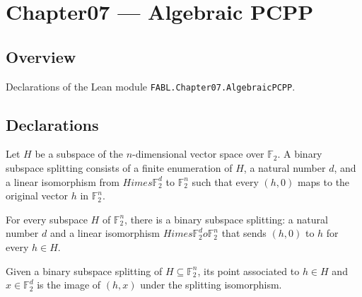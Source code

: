 \chapter{Chapter07 — Algebraic PCPP}
\section{Overview}

Declarations of the Lean module \texttt{FABL.Chapter07.AlgebraicPCPP}.

\section{Declarations}

\begin{definition}
\label{FABL.BinarySubspaceSplit}
\leanok
{}
Let $H$ be a subspace of the $n$-dimensional vector space over $\mathbb{F}_2$. A binary
subspace splitting consists of a finite enumeration of $H$, a natural number $d$, and a
linear isomorphism from $H	imes\mathbb{F}_2^d$ to $\mathbb{F}_2^n$ such that every $(h,0)$ maps to the
original vector $h$ in $\mathbb{F}_2^n$.
\end{definition}

\begin{definition}
\label{FABL.binarySubspaceSplit}
\leanok
{}
For every subspace $H$ of $\mathbb{F}_2^n$, there is a binary subspace splitting: a natural
number $d$ and a linear isomorphism $H	imes\mathbb{F}_2^d	o\mathbb{F}_2^n$ that sends $(h,0)$ to $h$
for every $h\in H$.
\end{definition}

\begin{definition}
\label{FABL.BinarySubspaceSplit.point}
\leanok
{}
Given a binary subspace splitting of $H\subseteq\mathbb{F}_2^n$, its point associated to $h\in
H$ and $x\in\mathbb{F}_2^d$ is the image of $(h,x)$ under the splitting isomorphism.
\end{definition}


